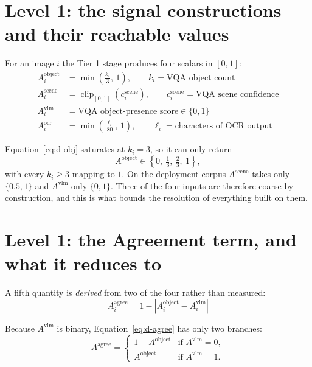 \documentclass[12pt,a4paper]{report}
\begin{document}
\section{Level 1: the signal constructions and their reachable values}

For an image $i$ the Tier 1 stage produces four scalars in $[0,1]$:
\begin{align}
A_i^{\text{object}} &= \min\!\left(\tfrac{k_i}{3},\, 1\right), \qquad k_i = \text{VQA object count} \label{eq:d-obj}\\
A_i^{\text{scene}}  &= \operatorname{clip}_{[0,1]}\!\left(c_i^{\text{scene}}\right), \qquad c_i^{\text{scene}} = \text{VQA scene confidence} \label{eq:d-scene}\\
A_i^{\text{vlm}}    &= \text{VQA object-presence score} \in \{0,1\} \label{eq:d-vlm}\\
A_i^{\text{ocr}}    &= \min\!\left(\tfrac{\ell_i}{80},\, 1\right), \qquad \ell_i = \text{characters of OCR output} \label{eq:d-ocr}
\end{align}

Equation~\ref{eq:d-obj} saturates at $k_i=3$, so it can only return
\[
A^{\text{object}} \in \left\{0,\ \tfrac13,\ \tfrac23,\ 1\right\},
\]
with every $k_i \ge 3$ mapping to $1$. On the deployment corpus $A^{\text{scene}}$ takes only $\{0.5, 1\}$ and $A^{\text{vlm}}$ only $\{0,1\}$. Three of the four inputs are therefore coarse by construction, and this is what bounds the resolution of everything built on them.

\section{Level 1: the Agreement term, and what it reduces to}

A fifth quantity is \emph{derived} from two of the four rather than measured:
\begin{equation}
A_i^{\text{agree}} = 1 - \left|A_i^{\text{object}} - A_i^{\text{vlm}}\right|
\label{eq:d-agree}
\end{equation}

Because $A^{\text{vlm}}$ is binary, Equation~\ref{eq:d-agree} has only two branches:
\begin{equation}
A^{\text{agree}} =
\begin{cases}
1 - A^{\text{object}} & \text{if } A^{\text{vlm}} = 0,\\[2pt]
A^{\text{object}}     & \text{if } A^{\text{vlm}} = 1.
\end{cases}
\label{eq:d-agree-cases}
\end{equation}
\end{document}
